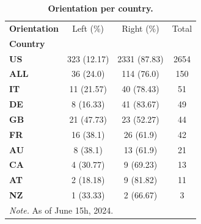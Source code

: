 \begin{table}[H]
\centering
\caption{\textbf{Orientation per country.}}
\label{table:table3}
\begin{tabularx}{\textwidth}{ X c c c}
\toprule
\textbf{Orientation} &     Left (\%) &     Right (\%) &  Total \\
\textbf{Country} &              &               &        \\
\midrule
\textbf{US     } &  323 (12.17) &  2331 (87.83) &   2654 \\
\textbf{ALL    } &    36 (24.0) &    114 (76.0) &    150 \\
\textbf{IT     } &   11 (21.57) &    40 (78.43) &     51 \\
\textbf{DE     } &    8 (16.33) &    41 (83.67) &     49 \\
\textbf{GB     } &   21 (47.73) &    23 (52.27) &     44 \\
\textbf{FR     } &    16 (38.1) &     26 (61.9) &     42 \\
\textbf{AU     } &     8 (38.1) &     13 (61.9) &     21 \\
\textbf{CA     } &    4 (30.77) &     9 (69.23) &     13 \\
\textbf{AT     } &    2 (18.18) &     9 (81.82) &     11 \\
\textbf{NZ     } &    1 (33.33) &     2 (66.67) &      3 \\
\bottomrule
\multicolumn{5}{l}{\textit{Note.} As of June 15h, 2024.}
\end{tabularx}
\end{table}
